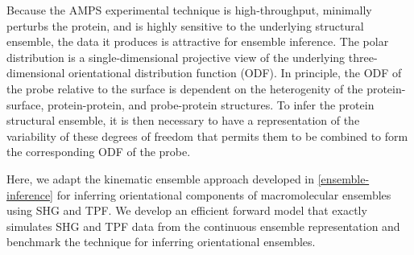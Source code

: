 \documentclass[../../main.tex]{subfiles}
\begin{document}
\begin{refsection}
	Because the AMPS experimental technique is high-throughput, minimally perturbs the protein, and is highly sensitive to the underlying structural ensemble, the data it produces is attractive for ensemble inference.
	The polar distribution is a single-dimensional projective view of the underlying three-dimensional orientational distribution function (ODF).
	In principle, the ODF of the probe relative to the surface is dependent on the heterogenity of the protein-surface, protein-protein, and probe-protein structures.
	To infer the protein structural ensemble, it is then necessary to have a representation of the variability of these degrees of freedom that permits them to be combined to form the corresponding ODF of the probe.

	Here, we adapt the kinematic ensemble approach developed in \cref{ensemble-inference} for inferring orientational components of macromolecular ensembles using SHG and TPF.
	We develop an efficient forward model that exactly simulates SHG and TPF data from the continuous ensemble representation and benchmark the technique for inferring orientational ensembles.










\end{refsection}
\end{document}
